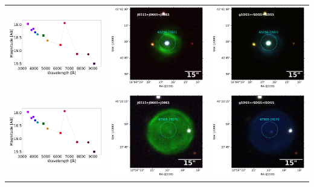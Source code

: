 \begin{table}
\begin{tabular}{ccc}
\includegraphics[width=0.3\linewidth, clip]{figs-pca/photospectrum_64343-69243-Missing-pne-allinf-v2_MAG_APER_6_0.pdf} & \includegraphics[width=0.3\linewidth, clip]{Field_65750/1000001-JPLUS-01561-v202006_J0861_65750-23821-RGB.pdf} & \includegraphics[width=0.3\linewidth, clip]{Field_65750/1000001-JPLUS-01561-v202006_iSDSS_65750-23821-RGB.pdf} \\
\includegraphics[width=0.3\linewidth, clip]{figs-pca/photospectrum_64343-69243-Missing-pne-allinf-v2_MAG_APER_6_0.pdf} & \includegraphics[width=0.3\linewidth, clip]{Field_67905/1000001-JPLUS-02140-v202006_J0861_67905-25070-RGB.pdf} & \includegraphics[width=0.3\linewidth, clip]{Field_67905/1000001-JPLUS-02140-v202006_iSDSS_67905-25070-RGB.pdf} \\

\end{tabular}
\end{table}
